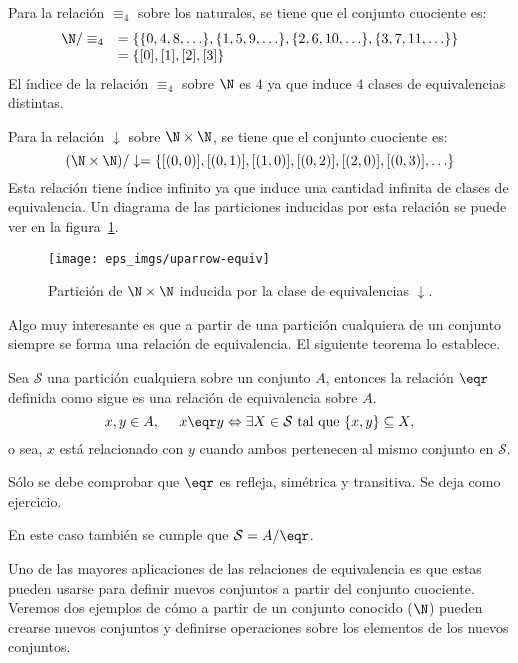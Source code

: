 \begin{ejemplo}
Para la relación $\equiv_4$ sobre los naturales, se tiene que el conjunto cuociente es:
\[
\begin{array}{rl}
\N/\equiv_4&=\{\{0,4,8,\ldots\},\{1,5,9,\ldots\},\{2,6,10,\ldots\},\{3,7,11,\ldots\}\} \\
&=\{[0],[1],[2],[3]\}
\end{array}
\]
El índice de la relación $\equiv_4$ sobre $\N$ es $4$ ya que induce $4$ clases de equivalencias distintas.

Para la relación $\downarrow$ sobre $\N\times\N$, se tiene que el conjunto cuociente es:
\[
(\N\times\N)/\downarrow=\{[(0,0)],[(0,1)],[(1,0)],[(0,2)],[(2,0)],[(0,3)],\ldots\}
\]
Esta relación tiene índice infinito ya que induce una cantidad infinita de clases de equivalencia.
Un diagrama de las particiones inducidas por esta relación se puede ver en la figura~\ref{fig:uparrow-equiv}.
\begin{figure}[h!]
\centering
\texttt{[image: eps\_imgs/uparrow-equiv]}
\caption{Partición de $\N\times\N$ inducida por la clase de equivalencias $\downarrow$.}
\label{fig:uparrow-equiv}
\end{figure}
\end{ejemplo}

Algo muy interesante es que a partir de una partición cualquiera de un conjunto siempre se forma una relación de equivalencia.
El siguiente teorema lo establece.

\begin{teorema}
Sea $\mathcal S$ una partición cualquiera sobre un conjunto $A$, entonces la relación $\eqr$ definida como sigue es una relación de equivalencia sobre $A$.
\[
x,y\in A,\;\;\;\;\; x\eqr y\Leftrightarrow \exists X\in\mathcal S\text{ tal que }\{x,y\}\subseteq X,
\]
o sea, $x$ está relacionado con $y$ cuando ambos pertenecen al mismo conjunto en $\mathcal S$.

\begin{demostracion}
Sólo se debe comprobar que $\eqr$ es refleja, simétrica y transitiva.
Se deja como ejercicio.
\end{demostracion}

En este caso también se cumple que $\mathcal S=A/\eqr$.
\end{teorema}

Uno de las mayores aplicaciones de las relaciones de equivalencia es que estas pueden usarse para definir nuevos conjuntos a partir del conjunto cuociente.
Veremos dos ejemplos de cómo a partir de un conjunto conocido ($\N$) pueden crearse nuevos conjuntos y definirse operaciones sobre los elementos de los nuevos conjuntos.

